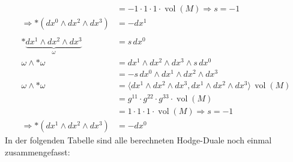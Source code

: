 \begin{align*}
	&=
	-1 \cdot 1 \cdot 1 \cdot \operatorname{vol}(M) \Rightarrow s = -1
	\\
	\Rightarrow \ast (dx^0 \wedge dx^2 \wedge dx^3) 
	&= - dx^1
\\
\\
	\ast \underbrace{dx^1 \wedge dx^2 \wedge dx^3}_{\omega}
	&=
	s \, dx^0
	\\
	\omega \wedge \ast \omega 
	&=
	dx^1 \wedge dx^2 \wedge dx^3 \wedge s \, dx^0
	\\
	&=
	-s \, dx^0 \wedge dx^1 \wedge dx^2 \wedge dx^3
	\\
	\omega \wedge \ast \omega
	&=
	\langle dx^1 \wedge dx^2 \wedge dx^3 , dx^1 \wedge dx^2 \wedge dx^3 \rangle \, \operatorname{vol}(M)
	\\
	&=
	g^{11} \cdot g^{22} \cdot g^{33} \cdot \operatorname{vol}(M)
	\\
	&=
	1 \cdot 1 \cdot 1 \cdot \operatorname{vol}(M) \Rightarrow s = -1
	\\
	\Rightarrow \ast (dx^1 \wedge dx^2 \wedge dx^3) 
	&= - dx^0
\end{align*}
In der folgenden Tabelle sind alle berechneten Hodge-Duale noch einmal zusammengefasst:


